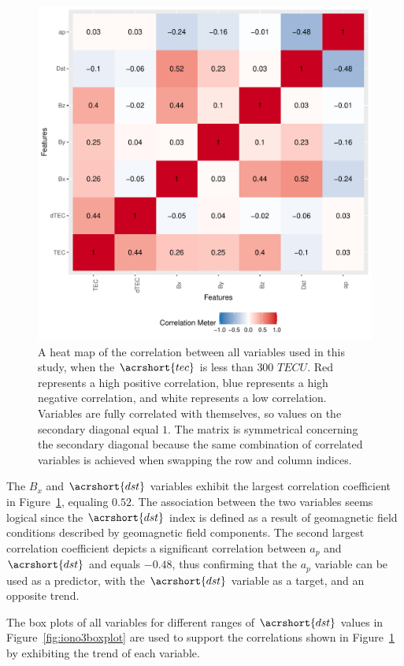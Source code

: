 \let\LaTeXcline\cline\documentclass[sn-mathphys-num]{sn-jnl}\let\cline\LaTeXcline
\begin{document}
\begin{figure}[!ht]
 \centering
 \includegraphics[width=0.7\linewidth]{iono3correlation.pdf}
    \caption{A heat map of the correlation between all variables used in this study, when the $\acrshort{tec}$ is less than $300$ $TECU$. Red represents a high positive correlation, blue represents a high negative correlation, and white represents a low correlation. Variables are fully correlated with themselves, so values on the secondary diagonal equal $1$. The matrix is symmetrical concerning the secondary diagonal because the same combination of correlated variables is achieved when swapping the row and column indices.}
    \label{fig:correlation}
\end{figure}

The $B_{x}$ and $\acrshort{dst}$ variables exhibit the largest correlation coefficient in Figure~\ref{fig:correlation}, equaling $0.52$. The association between the two variables seems logical since the $\acrshort{dst}$ index is defined as a result of geomagnetic field conditions described by geomagnetic field components. The second largest correlation coefficient depicts a significant correlation between $a_{p}$ and $\acrshort{dst}$ and equals $-0.48$, thus confirming that the $a_{p}$ variable can be used as a predictor, with the $\acrshort{dst}$ variable as a target, and an opposite trend.

The box plots of all variables for different ranges of $\acrshort{dst}$ values in Figure~\ref{fig:iono3boxplot} are used to support the correlations shown in Figure~\ref{fig:correlation} by exhibiting the trend of each variable.
\end{document}
